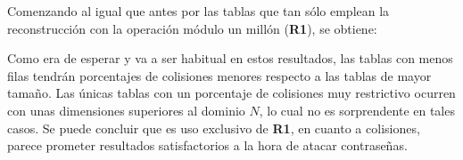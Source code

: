 \documentclass[12pt,spanish,listoffigures,listoftables]{tfgetsinf}
\begin{document}
Comenzando al igual que antes por las tablas que tan sólo emplean la reconstrucción con la operación módulo un millón (\textbf{R1}), se obtiene:

\def\arraystretch{1.5}
\begin{table}[H]
	\centering
	\caption{Porcentajes de colisiones para las tablas empleando \textbf{R1}}
	\label{colR1}
\end{table}

Como era de esperar y va a ser habitual en estos resultados, las tablas con menos filas tendrán porcentajes de colisiones menores respecto a las tablas de mayor tamaño. Las únicas tablas con un porcentaje de colisiones muy restrictivo ocurren con unas dimensiones superiores al dominio $N$, lo cual no es sorprendente en tales casos. Se puede concluir que es uso exclusivo de \textbf{R1}, en cuanto a colisiones, parece prometer resultados satisfactorios a la hora de atacar contraseñas.
\end{document}
